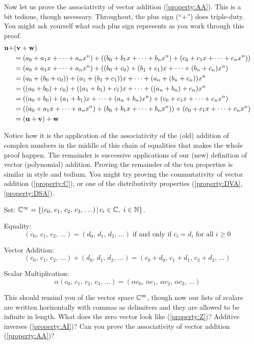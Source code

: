 \documentclass{ximera}
\begin{document}
\begin{example}
\begin{feedback}[correct]
    Now let us prove the associativity of vector addition
    (\ref{property:AA}).  This is a bit tedious, though necessary.
    Throughout, the plus sign (``+'') does triple-duty.  You might ask
    yourself what each plus sign represents as you work through this
    proof.
    \begin{align*}
      \mathbf{u}+&(\mathbf{v}+\mathbf{w})\\
               &=(a_0+a_1x+\cdots+a_nx^n)+\left((b_0+b_1x+\cdots+b_nx^n)+(c_0+c_1x+\cdots+c_nx^n)\right)\\
               &=(a_0+a_1x+\cdots+a_nx^n)+((b_0+c_0)+(b_1+c_1)x+\cdots+(b_n+c_n)x^n)\\
               &=(a_0+(b_0+c_0))+(a_1+(b_1+c_1))x+\cdots+(a_n+(b_n+c_n))x^n\\
               &=((a_0+b_0)+c_0)+((a_1+b_1)+c_1)x+\cdots+((a_n+b_n)+c_n)x^n\\
               &=((a_0+b_0)+(a_1+b_1)x+\cdots+(a_n+b_n)x^n)+(c_0+c_1x+\cdots+c_nx^n)\\
               &=\left((a_0+a_1x+\cdots+a_nx^n)+(b_0+b_1x+\cdots+b_nx^n)\right)+(c_0+c_1x+\cdots+c_nx^n)\\
               &=(\mathbf{u}+\mathbf{v})+\mathbf{w}
    \end{align*}

    Notice how it is the application of the associativity of the (old)
    addition of complex numbers in the middle of this chain of
    equalities that makes the whole proof happen.  The remainder is
    successive applications of our (new) definition of vector
    (polynomial) addition.  Proving the remainder of the ten
    properties is similar in style and tedium.  You might try proving
    the commutativity of vector addition (\ref{property:C}), or one of
    the distributivity properties (\ref{property:DVA},
    \ref{property:DSA}).
  \end{feedback}
\end{example}

\begin{example}

Set: $\complex{\infty}=\setparts{(c_0,\,c_1,\,c_2,\,c_3,\,\ldots)}{c_i\in\complexes,\ i\in\mathbb{N}}$.

Equality:
\[
  (c_0,\,c_1,\,c_2,\,\ldots)=(d_0,\,d_1,\,d_2,\,\ldots)\text{ if and only if }c_i=d_i\text{ for all }i\geq 0
\]

Vector Addition:
\[
  (c_0,\,c_1,\,c_2,\,\ldots)+(d_0,\,d_1,\,d_2,\,\ldots)=(c_0+d_0,\,c_1+d_1,\,c_2+d_2,\,\ldots)
\]

Scalar Multiplication:
\[
  \alpha (c_0,\,c_1,\,c_2,\,c_3,\,\ldots)=(\alpha c_0,\,\alpha c_1,\,\alpha c_2,\,\alpha c_3,\,\ldots)
\]

This should remind you of the vector space $\mathbb{C}^{m}$, though now
our lists of scalars are written horizontally with commas as
delimiters and they are allowed to be infinite in length.  What does
the zero vector look like (\ref{property:Z})?  Additive inverses
(\ref{property:AI})?  Can you prove the associativity of vector
addition (\ref{property:AA})?
\end{example}
\end{document}
